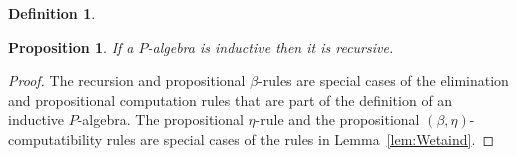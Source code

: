 \documentclass[reqno,10pt,a4paper,oneside]{amsart}
\numberwithin{equation}{section}
\theoremstyle{mythm}
\newtheorem{proposition}[theorem]{Proposition}
\theoremstyle{mydef}
\newtheorem{definition}[theorem]{Definition}
\theoremstyle{myrmk}
\newcommand{\ct}{%
  \mathchoice{\mathbin{\raisebox{0.5ex}{$\displaystyle\centerdot$}}}%
             {\mathbin{\raisebox{0.5ex}{$\centerdot$}}}%
             {\mathbin{\raisebox{0.25ex}{$\scriptstyle\,\centerdot\,$}}}%
             {\mathbin{\raisebox{0.1ex}{$\scriptscriptstyle\,\centerdot\,$}}}}
\newcommand{\funext}{\leftidx{^\Pi}{\mathsf{Eq}}^{=}}
\newcommand{\lam}[1]{\lambda_{#1}}
\newcommand{\app}{\mathsf{ap}}
\newcommand{\W}{\mathsf{W}}
\newcommand{\wsup}{\mathsf{sup}}
\newcommand{\wrecuniq}{\mathsf{wrec}\text{-}\mathsf{uniq}}
\newcommand{\wreccoh}{\mathsf{wrec}\text{-}\mathsf{coh}}
\newcommand{\UU}{\mathsf{U}}
\begin{document}
\begin{definition}
\begin{enumerate}[(i)]

\end{enumerate}
\end{definition}


\begin{proposition} \label{thm:Windrec}
If a $P$-algebra is inductive then it is recursive.
\end{proposition}


\begin{proof} The recursion and propositional $\beta$-rules are special cases of the elimination and propositional computation rules that are part of the definition of an inductive $P$-algebra. The propositional $\eta$-rule and the
propositional $(\beta, \eta)$-computatibility rules are special cases of the rules in Lemma~\ref{lem:Wetaind}. 
\end{proof}


\end{document}
